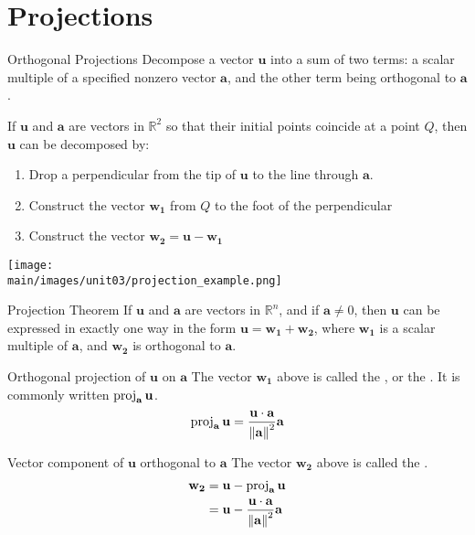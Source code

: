 \documentclass[\main/notes.tex]{subfiles}
\begin{document}
		\section{Projections}
			\begin{definition}{Orthogonal Projections}
				Decompose a vector $\mathbf{u}$ into a sum of two terms: a scalar multiple of a specified nonzero vector $\mathbf{a}$, and the other term being orthogonal to $\mathbf{a}$.

				If $\mathbf{u}$ and $\mathbf{a}$ are vectors in $\mathbb{R}^{2}$ so that their initial points coincide at a point $Q$, then $\mathbf{u}$ can be decomposed by:
				\begin{enumerate}
					\item Drop a perpendicular from the tip of $\mathbf{u}$ to the line through $\mathbf{a}$.
					\item Construct the vector $\mathbf{w_{1}}$ from $Q$ to the foot of the perpendicular
					\item Construct the vector $\mathbf{w_{2}} = \mathbf{u} - \mathbf{w_{1}}$
				\end{enumerate}
				\begin{center}
					\texttt{[image: \\main/images/unit03/projection\_example.png]}
				\end{center}
			\end{definition}
			\begin{theorem}{Projection Theorem}
				If $\mathbf{u}$ and $\mathbf{a}$ are vectors in $\mathbb{R}^{n}$, and if $\mathbf{a} \neq 0$, then $\mathbf{u}$ can be expressed in exactly one way in the form $\mathbf{u} = \mathbf{w_{1}} + \mathbf{w_{2}}$, where $\mathbf{w_{1}}$ is a scalar multiple of $\mathbf{a}$, and $\mathbf{w_{2}}$ is orthogonal to $\mathbf{a}$.
			\end{theorem}
			\begin{definition}{Orthogonal projection of $\mathbf{u}$ on $\mathbf{a}$}
				The vector $\mathbf{w_{1}}$ above is called the , or the . It is commonly written $\operatorname{proj}_{\mathbf{a}}\mathbf{u}$.
				\begin{align*}
					\operatorname{proj}_{\mathbf{a}}\mathbf{u} = \frac{\mathbf{u} \cdot \mathbf{a}}{\left\lVert \mathbf{a}\right\rVert^{2}}\mathbf{a}
				\end{align*}
			\end{definition}
			\begin{definition}{Vector component of $\mathbf{u}$ orthogonal to $\mathbf{a}$}
				The vector $\mathbf{w_{2}}$ above is called the .
				\begin{align*}
					\mathbf{w_{2}} &= \mathbf{u} - \operatorname{proj}_{\mathbf{a}}\mathbf{u}\\
					&= \mathbf{u} - \frac{\mathbf{u} \cdot \mathbf{a}}{\left\lVert \mathbf{a}\right\rVert^{2}}\mathbf{a}
				\end{align*}
			\end{definition}
\end{document}
